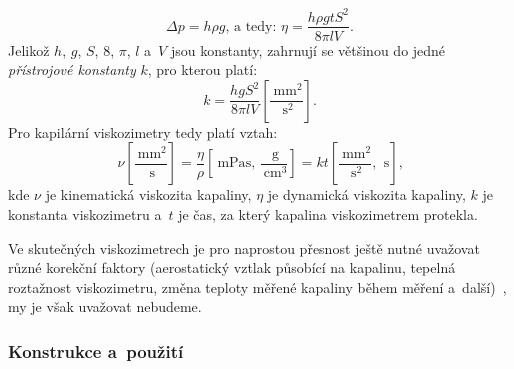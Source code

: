 \documentclass[12pt]{article}
\begin{document}
\begin{equation}
    \Delta p = h\rho g \text{, a~tedy: }\eta = \frac{h\rho gtS^2}{8\pi lV}\text{.}
\end{equation}
Jelikož $h$, $g$, $S$, $8$, $\pi$, $l$ a~$V$ jsou konstanty, zahrnují se většinou do jedné \emph{přístrojové konstanty} $k$, pro kterou platí:
\begin{equation}
    k = \frac{hgS^2}{8\pi lV}\left[\frac{\SI{}{\milli\metre\squared}}{\SI{}{\second\squared}}\right]\text{.}
\end{equation}
Pro kapilární viskozimetry tedy platí vztah:
\begin{equation}
    \nu\left[\frac{\SI{}{\milli\metre\squared}}{\SI{}{\second}}\right] = \frac{\eta}{\rho}\left[\SI{}{\milli\pascal\second}\text{, } \frac{\SI{}{\gram}}{\SI{}{\centi\meter\cubed}}\right]= kt\left[\frac{\SI{}{\milli\metre\squared}}{\SI{}{\second\squared}}\text{, }\SI{}{\second}\right]\text{,}\label{eq:kapilarni_viskozimetr}
\end{equation}
kde $\nu$ je kinematická viskozita kapaliny, $\eta$ je dynamická viskozita kapaliny, $k$ je konstanta viskozimetru a~$t$ je čas, za který kapalina viskozimetrem protekla.
\par
Ve skutečných viskozimetrech je pro naprostou přesnost ještě nutné uvažovat různé korekční faktory (aerostatický vztlak působící na kapalinu, tepelná roztažnost viskozimetru, změna teploty měřené kapaliny během měření a~další)~\cite{book:Calibration_of_viscometers}, my je však uvažovat nebudeme.

\subsubsection{Konstrukce a~použití}%
\end{document}
